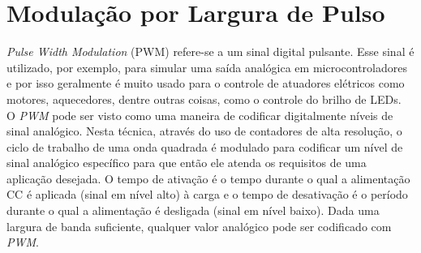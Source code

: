 \section{Modulação por Largura de Pulso}
\label{sec:PWM}

\emph{Pulse Width Modulation} (PWM) refere-se a um sinal digital pulsante. Esse sinal é utilizado, por exemplo, para simular uma saída analógica em microcontroladores e por isso geralmente é muito usado para o controle de atuadores elétricos como motores, aquecedores, dentre outras coisas, como o controle do brilho de LEDs. \\

O \emph{PWM} pode ser visto como uma maneira de codificar digitalmente níveis de sinal analógico. Nesta técnica, através do uso de contadores de alta resolução, o ciclo de trabalho de uma onda quadrada é modulado para codificar um nível de sinal analógico específico para que então ele atenda os requisitos de uma aplicação desejada. O tempo de ativação é o tempo durante o qual a alimentação CC é aplicada (sinal em nível alto) à carga e o tempo de desativação é o período durante o qual a alimentação é desligada (sinal em nível baixo). Dada uma largura de banda suficiente, qualquer valor analógico pode ser codificado com \emph{PWM}.